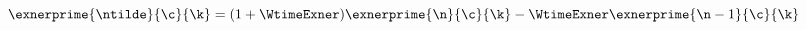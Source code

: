 $\exnerprime{\ntilde}{\c}{\k} = (1 + \WtimeExner) \exnerprime{\n}{\c}{\k} - \WtimeExner \exnerprime{\n-1}{\c}{\k}$
